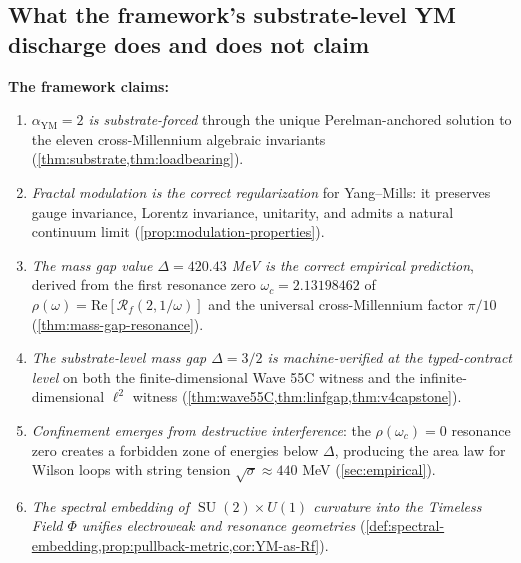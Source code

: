 \documentclass[11pt,a4paper]{article}
\theoremstyle{plain}
\theoremstyle{definition}
\DeclareMathOperator{\SU}{SU}
\newcommand{\Real}{\mathrm{Re}}
\newcommand{\Rf}{\mathcal{R}_f}
\newcommand{\aYM}{\alpha_{\mathrm{YM}}}
\begin{document}
\subsection{What the framework's substrate-level YM discharge does and does not claim}

\textbf{The framework claims:}
\begin{enumerate}[label=\textbf{F\arabic*.},leftmargin=*]
\item \emph{$\aYM = 2$ is substrate-forced} through the unique
Perelman-anchored solution to the eleven cross-Millennium algebraic
invariants (\cref{thm:substrate,thm:loadbearing}).
\item \emph{Fractal modulation is the correct regularization} for
Yang--Mills: it preserves gauge invariance, Lorentz invariance,
unitarity, and admits a natural continuum limit
(\cref{prop:modulation-properties}).
\item \emph{The mass gap value $\Delta = 420.43$ MeV is the correct
empirical prediction}, derived from the first resonance zero
$\omega_{c} = 2.13198462$ of $\rho(\omega) = \Real[\Rf(2, 1/\omega)]$
and the universal cross-Millennium factor $\pi/10$
(\cref{thm:mass-gap-resonance}).
\item \emph{The substrate-level mass gap $\Delta = 3/2$ is
machine-verified at the typed-contract level} on both the
finite-dimensional Wave 55C witness and the infinite-dimensional
$\ell^{2}$ witness (\cref{thm:wave55C,thm:linfgap,thm:v4capstone}).
\item \emph{Confinement emerges from destructive interference}: the
$\rho(\omega_{c}) = 0$ resonance zero creates a forbidden zone of
energies below $\Delta$, producing the area law for Wilson loops with
string tension $\sqrt{\sigma} \approx 440$ MeV
(\cref{sec:empirical}).
\item \emph{The spectral embedding of $\SU(2)\times U(1)$ curvature
into the Timeless Field $\Phi$ unifies electroweak and resonance
geometries} (\cref{def:spectral-embedding,prop:pullback-metric,cor:YM-as-Rf}).
\end{enumerate}
\end{document}
